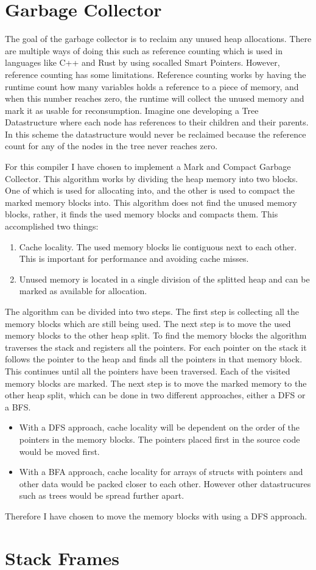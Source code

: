 \section*{Garbage Collector} 
The goal of the garbage collector is to reclaim any unused heap allocations. There are multiple ways of doing this such as reference counting which is used in languages like C++ and Rust by using socalled Smart Pointers. However, reference counting has some limitations. Reference counting works by having the runtime count how many variables holds a reference to a piece of memory, and when this number reaches zero, the runtime will collect the unused memory and mark it as usable for reconsumption. Imagine one developing a Tree Datastructure where each node has references to their children and their parents. In this scheme the datastructure would never be reclaimed because the reference count for any of the nodes in the tree never reaches zero. 

For this compiler I have chosen to implement a Mark and Compact Garbage Collector. This algorithm works by dividing the heap memory into two blocks. One of which is used for allocating into, and the other is used to compact the marked memory blocks into. This algorithm does not find the unused memory blocks, rather, it finds the used memory blocks and compacts them. This accomplished two things: 
\begin{enumerate}
    \item Cache locality. The used memory blocks lie contiguous next to each other. This is important for performance and avoiding cache misses.
    \item Unused memory is located in a single division of the splitted heap and can be marked as available for allocation. 
\end{enumerate}
The algorithm can be divided into two steps. The first step is collecting all the memory blocks which are still being used. The next step is to move the used memory blocks to the other heap split.
To find the memory blocks the algorithm traverses the stack and registers all the pointers. For each pointer on the stack it follows the pointer to the heap and finds all the pointers in that memory block. This continues until all the pointers have been traversed. Each of the visited memory blocks are marked. The next step is to move the marked memory to the other heap split, which can be done in two different approaches, either a DFS or a BFS. 

\begin{itemize}
    \item With a DFS approach, cache locality will be dependent on the order of the pointers in the memory blocks. The pointers placed first in the source code would be moved first.
    \item With a BFA approach, cache locality for arrays of structs with pointers and other data would be packed closer to each other. However other datastrucures such as trees would be spread further apart.
\end{itemize}
Therefore I have chosen to move the memory blocks with using a DFS approach. 

\section*{Stack Frames}
